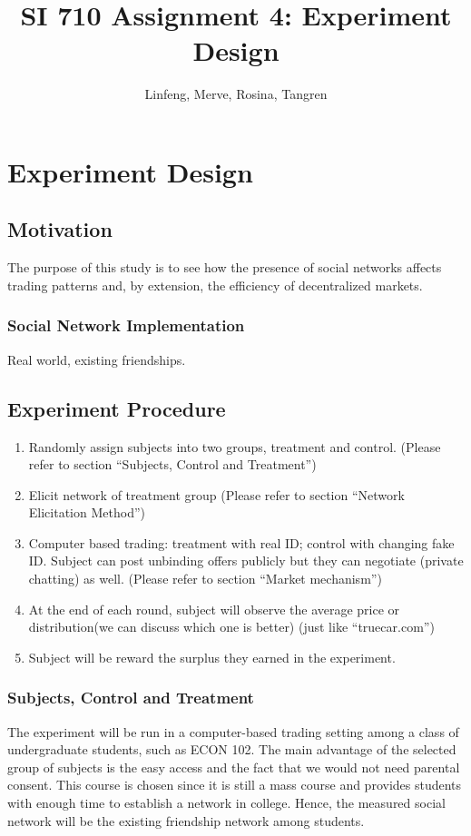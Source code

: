 \documentclass{article}
\title{SI 710 Assignment 4: Experiment Design}
\author{Linfeng, Merve, Rosina, Tangren}
\date{}
\begin{document}
\maketitle
\tableofcontents
%

\section{Experiment Design}
\subsection{Motivation}
The purpose of this study is to see how the presence of social networks affects
trading patterns and, by extension, the efficiency of decentralized markets.


\subsubsection{Social Network Implementation}
Real world, existing friendships.

\subsection{Experiment Procedure}
\begin{enumerate}
    \item Randomly assign subjects into two groups, treatment and control.
        (Please refer to section ``Subjects, Control and Treatment'')
    \item Elicit network of treatment group (Please refer to section ``Network
        Elicitation Method'')
    \item Computer based trading: treatment with real ID; control with changing
        fake ID. Subject can post unbinding offers publicly but they can
        negotiate (private chatting) as well. (Please refer to section ``Market
        mechanism'')
    \item At the end of each round, subject will observe the average price or
        distribution(we can discuss which one is better) (just like
        ``truecar.com'')
    \item Subject will be reward the surplus they earned in the experiment.
\end{enumerate}

\subsubsection{Subjects, Control and Treatment}
The experiment will be run in a computer-based trading setting among a class of
undergraduate students, such as ECON 102. The main advantage of the selected
group of subjects is the easy access and the fact that we would not need
parental consent. This course is chosen since it is still a mass course and
provides students with enough time to establish a network in college. Hence, the
measured social network will be the existing friendship network among students.
\end{document}
